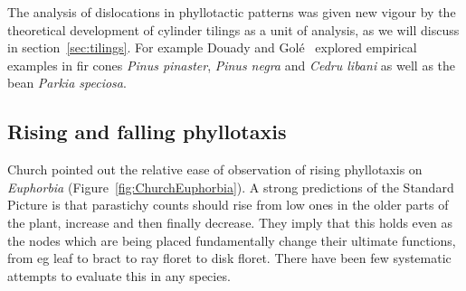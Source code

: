 
The analysis of dislocations in phyllotactic patterns was given new vigour by the theoretical development of cylinder tilings as a unit of analysis, as we will discuss in section~\ref{sec:tilings}. For example Douady and Golé~\autocite{douadyFibonacciQuasisymmetricPhyllotaxis2016} explored empirical examples in fir cones \textit{Pinus pinaster}, \textit{Pinus negra} and \textit{Cedru libani} as well as the bean \textit{Parkia speciosa}. 

  
 \subsection{Rising and falling phyllotaxis}
Church pointed out the relative ease of observation of rising phyllotaxis on \textit{Euphorbia} (Figure~\ref{fig:ChurchEuphorbia}). 
A strong predictions of the Standard Picture is that parastichy counts should rise from low ones in the older parts of the plant, increase and then finally decrease. They imply that this holds even as the nodes which are being placed fundamentally change their ultimate functions, from eg leaf to bract to ray floret to disk floret. There have been few systematic attempts to evaluate this in any species. 

